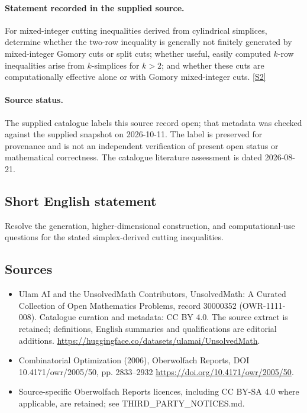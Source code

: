 \documentclass[11pt]{article}
\begin{document}
\paragraph{Statement recorded in the supplied source.}
For mixed-integer cutting inequalities derived from cylindrical simplices, determine whether the two-row inequality is generally not finitely generated by mixed-integer Gomory cuts or split cuts; whether useful, easily computed $k$-row inequalities arise from $k$-simplices for $k>2$; and whether these cuts are computationally effective alone or with Gomory mixed-integer cuts. \href{https://doi.org/10.4171/owr/2005/50}{[S2]}
\paragraph{Source status.}
The supplied catalogue labels this source record open; that metadata was checked against the supplied snapshot on 2026-10-11. The label is preserved for provenance and is not an independent verification of present open status or mathematical correctness. The catalogue literature assessment is dated 2026-08-21.
\subsection{Short English statement}
Resolve the generation, higher-dimensional construction, and computational-use questions for the stated simplex-derived cutting inequalities.
\subsection{Sources}
\begin{itemize}
\item[S1] Ulam AI and the UnsolvedMath Contributors, UnsolvedMath: A Curated Collection of Open Mathematics Problems, record 30000352 (OWR-1111-008). Catalogue curation and metadata: CC BY 4.0. The source extract is retained; definitions, English summaries and qualifications are editorial additions.
\url{https://huggingface.co/datasets/ulamai/UnsolvedMath}.
\item[S2] Combinatorial Optimization (2006), Oberwolfach Reports, DOI 10.4171/owr/2005/50, pp. 2833--2932
\url{https://doi.org/10.4171/owr/2005/50}.
\item Source-specific Oberwolfach Reports licences, including CC BY-SA 4.0 where applicable, are retained; see THIRD\_PARTY\_NOTICES.md.
\end{itemize}
\end{document}
